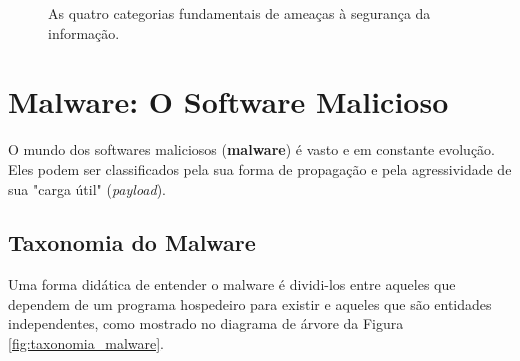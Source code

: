 \documentclass[12pt,a4paper,twoside]{report}
\begin{document}
\begin{figure}[h]
    \centering
    \caption{As quatro categorias fundamentais de ameaças à segurança da informação.}
    \label{fig:tipos_ameaca}
\end{figure}

\section{Malware: O Software Malicioso}

O mundo dos softwares maliciosos (\textbf{malware}) é vasto e em constante evolução. Eles podem ser classificados pela sua forma de propagação e pela agressividade de sua "carga útil" (\emph{payload}).

\subsection{Taxonomia do Malware}

Uma forma didática de entender o malware é dividi-los entre aqueles que dependem de um programa hospedeiro para existir e aqueles que são entidades independentes, como mostrado no diagrama de árvore da Figura \ref{fig:taxonomia_malware}.
\end{document}
